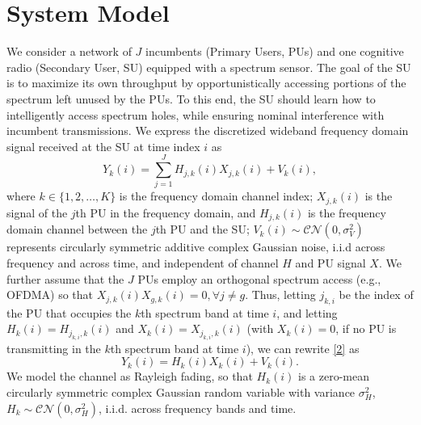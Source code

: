 \documentclass[10pt,twocolumn]{IEEEtran}
\begin{document}
\section{System Model}\label{II}
We consider a network of $J$ incumbents (Primary Users, PUs) and one cognitive radio (Secondary User, SU) equipped with a spectrum sensor. The goal of the SU is to maximize its own throughput by opportunistically accessing portions of the spectrum left unused by the PUs. To this end, the SU should learn how to intelligently access spectrum holes, while ensuring nominal interference with incumbent transmissions.
We express the discretized wideband frequency domain signal received at the SU
at time index $i$ as
\begin{equation}\label{2}
    Y_k(i) = \sum_{j=1}^{J} H_{j,k}(i)X_{j,k}(i) + V_k(i),
\end{equation}
where  $k {\in} \{1,2,\dots,K\}$
is the frequency domain channel index; $X_{j,k}(i)$ is the signal of the $j$th PU in the frequency domain, and $H_{j,k}(i)$ is the frequency domain channel between the $j$th PU and the SU; $V_k(i) {\sim} \mathcal{CN}(0,\sigma_V^2)$ represents circularly symmetric additive complex Gaussian noise, i.i.d across frequency and across time, and independent of channel $H$ and PU signal $X$. We further assume that the $J$ PUs employ an orthogonal spectrum access (e.g., OFDMA) so that $X_{j,k}(i)X_{g,k}(i){=}0, \forall j{\neq}g$. Thus, letting $j_{k,i}$ be the index of the PU that occupies the $k$th spectrum band at time $i$, and letting  $H_{k}(i){=}H_{j_{k,i},k}(i)$ and $X_{k}(i){=}X_{j_{k,i},k}(i)$ (with $X_{k}(i){=}0$, if no PU is transmitting in the $k$th spectrum band at time $i$), we can rewrite \eqref{2} as 
\begin{equation}\label{3}
    Y_k(i) = H_{k}(i)X_{k}(i) + V_k(i).
\end{equation}
We model the channel as Rayleigh fading, so that $H_{k}(i)$ is a zero-mean circularly symmetric complex Gaussian random variable with variance $\sigma_H^2$, $H_k {\sim} \mathcal{CN}(0,\sigma_H^2)$, i.i.d. across frequency bands and time.
\end{document}
